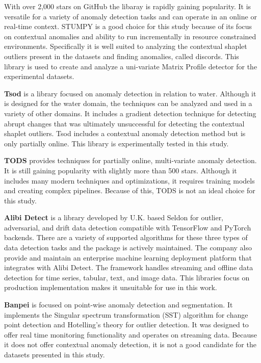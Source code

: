 With over 2,000 stars on GitHub the libaray is rapidly gaining popularity.
It is versatile for a variety of anomaly detection tasks and can operate in an online or real-time context.
STUMPY is a good choice for this study because of its focus on contextual anomalies and ability to run incrementally in resource constrained environments.
Specifically it is well suited to analyzing the contextual shaplet outliers present in the datasets and finding anomalies, called discords.
This library is used to create and analyze a uni-variate Matrix Profile detector for the experimental datasets.

\textbf{Tsod} \parencite{tsod} is a library focused on anomaly detection in relation to water.
Although it is designed for the water domain, the techniques can be analyzed and used in a variety of other domains.
It includes a gradient detection technique for detecting abrupt changes that was ultimately unsuccessful for detecting the contextual shaplet outliers.
Tsod includes a contextual anomaly detection method but is only partially online.
This library is experimentally tested in this study.

\textbf{TODS} \parencite{Lai_2021_TODS} provides techniques for partially online, multi-variate anomaly detection.
It is still gaining popularity with slightly more than 500 stars.
Although it includes many modern techniques and optimizations, it requires training models and creating complex pipelines.
Because of this, TODS is not an ideal choice for this study.

\textbf{Alibi Detect} \parencite{alibi-detect} is a library developed by U.K. based Seldon for outlier, adversarial, and drift data detection compatible with TensorFlow and PyTorch backends.
There are a variety of supported algorithms for these three types of data detection tasks and the package is actively maintained.
The company also provide and maintain an enterprise machine learning deployment platform that integrates with Alibi Detect.
The framework handles streaming and offline data detection for time series, tabular, text, and image data.
This libraries focus on production implementation makes it unsuitable for use in this work.

\textbf{Banpei} \parencite{banpei} is focused on point-wise anomaly detection and segmentation.
It implements the Singular spectrum transformation (SST) algorithm for change point detection and Hotelling's theory for outlier detection.
It was designed to offer real time monitoring functionality and operates on streaming data.
Because it does not offer contextual anomaly detection, it is not a good candidate for the datasets presented in this study.

